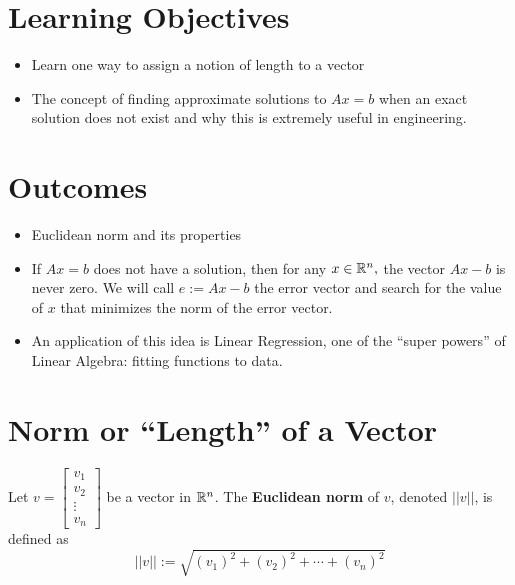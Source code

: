 \section*{Learning Objectives}
\begin{itemize}
\item Learn one way to assign a notion of length to a vector
\item The concept of finding approximate solutions to $Ax=b$ when an exact solution does not exist and why this is extremely useful in engineering.
\end{itemize}

\section*{Outcomes}
\begin{itemize}
\item Euclidean norm and its properties
\item If $Ax=b$ does not have a solution, then for any $x \in \mathbb R^n,$ the vector $Ax-b$ is never zero. We will call $e:=Ax-b$ the error vector and search for the value of $x$ that minimizes the norm of the error vector.
\item An application of this idea is Linear Regression, one of the ``super powers'' of Linear Algebra: fitting functions to data.
\end{itemize}


\vspace*{2cm}

\newpage

\section{Norm or ``Length'' of a Vector}


\begin{tcolorbox}[title=\textbf{Definition: The norm of a vector in $\boldsymbol{\real^n}$}]
Let $v=\begin{bmatrix} v_1 \\ v_2 \\ \vdots \\ v_n  \end{bmatrix} $ be a vector in $\mathbb R^n$. The \textbf{Euclidean norm} of $v$, denoted $||v||$, is defined as
\begin{equation}
    \label{eq"DefEuclideanNorm}
    ||v||:=\sqrt{(v_1)^2 + (v_2)^2 + \cdots + (v_n)^2}
\end{equation}
\mbox{ }
\end{tcolorbox}

